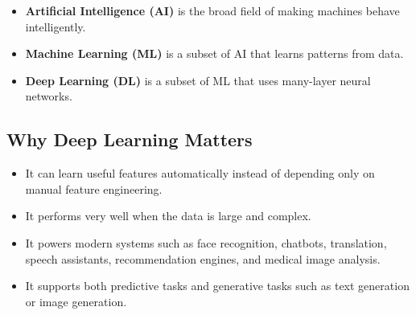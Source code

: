 \documentclass[11pt,a4paper]{article}
\begin{document}
\begin{center}
\end{center}

\begin{itemize}[leftmargin=1.5em, itemsep=3pt]
  \item \textbf{Artificial Intelligence (AI)} is the broad field of making machines behave intelligently.
  \item \textbf{Machine Learning (ML)} is a subset of AI that learns patterns from data.
  \item \textbf{Deep Learning (DL)} is a subset of ML that uses many-layer neural networks.
\end{itemize}

\subsection{Why Deep Learning Matters}

\begin{itemize}[leftmargin=*]
  \item It can learn useful features automatically instead of depending only on manual feature engineering.
  \item It performs very well when the data is large and complex.
  \item It powers modern systems such as face recognition, chatbots, translation, speech assistants, recommendation engines, and medical image analysis.
  \item It supports both predictive tasks and generative tasks such as text generation or image generation.
\end{itemize}
\end{document}
